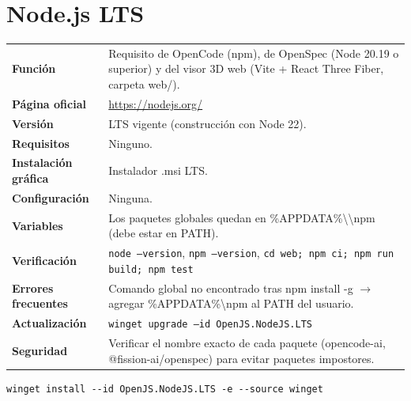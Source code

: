 \section{Node.js LTS}
{\small\begin{tabularx}{\linewidth}{@{}>{\bfseries}p{2.9cm}X@{}}\toprule
Función & Requisito de OpenCode (npm), de OpenSpec (Node 20.19 o superior) y del visor 3D web (Vite + React Three Fiber, carpeta web/).\\
Página oficial & \url{https://nodejs.org/}\\
Versión & LTS vigente (construcción con Node 22).\\
Requisitos & Ninguno.\\
Instalación gráfica & Instalador .msi LTS.\\
Configuración & Ninguna.\\
Variables & Los paquetes globales quedan en \%APPDATA\%\textbackslash{}\textbackslash{}npm (debe estar en PATH).\\
Verificación & \texttt{node --version}, \texttt{npm --version}, \texttt{cd web; npm ci; npm run build; npm test}\\
Errores frecuentes & Comando global no encontrado tras npm install -g $\rightarrow$ agregar \%APPDATA\%\textbackslash{}npm al PATH del usuario.\\
Actualización & \texttt{winget upgrade --id OpenJS.NodeJS.LTS}\\
Seguridad & Verificar el nombre exacto de cada paquete (opencode-ai, @fission-ai/openspec) para evitar paquetes impostores.\\
\bottomrule\end{tabularx}}
\begin{lstlisting}[style=ps]
winget install --id OpenJS.NodeJS.LTS -e --source winget
\end{lstlisting}

